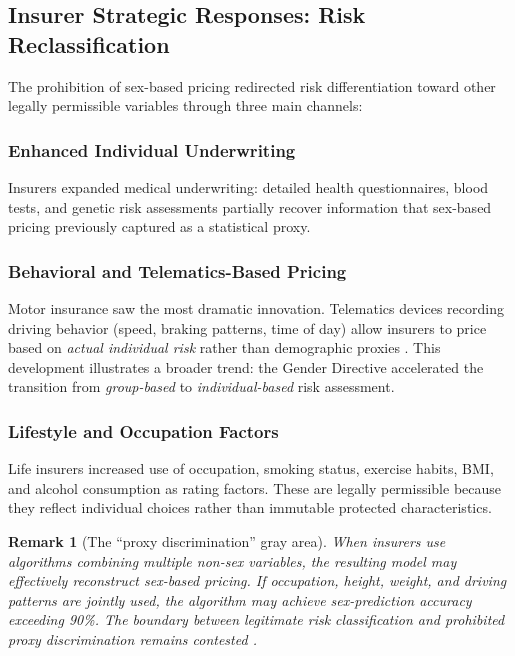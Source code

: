 \documentclass[12pt,a4paper]{article}
\newtheorem{remark}[definition]{Remark}
\begin{document}
\subsection{Insurer Strategic Responses: Risk Reclassification}
\label{subsec:insurer-responses}

The prohibition of sex-based pricing redirected risk differentiation toward other legally permissible variables through three main channels:

\subsubsection{Enhanced Individual Underwriting}

Insurers expanded medical underwriting: detailed health questionnaires, blood tests, and genetic risk assessments partially recover information that sex-based pricing previously captured as a statistical proxy.

\subsubsection{Behavioral and Telematics-Based Pricing}

Motor insurance saw the most dramatic innovation. Telematics devices recording driving behavior (speed, braking patterns, time of day) allow insurers to price based on \emph{actual individual risk} rather than demographic proxies \cite{cather2020}. This development illustrates a broader trend: the Gender Directive accelerated the transition from \emph{group-based} to \emph{individual-based} risk assessment.

\subsubsection{Lifestyle and Occupation Factors}

Life insurers increased use of occupation, smoking status, exercise habits, BMI, and alcohol consumption as rating factors. These are legally permissible because they reflect individual choices rather than immutable protected characteristics.

\begin{remark}[The ``proxy discrimination'' gray area]
When insurers use algorithms combining multiple non-sex variables, the resulting model may effectively reconstruct sex-based pricing. If occupation, height, weight, and driving patterns are jointly used, the algorithm may achieve sex-prediction accuracy exceeding 90\%. The boundary between legitimate risk classification and prohibited proxy discrimination remains contested \cite{ec_guidelines2012, chen2023}.
\end{remark}
\end{document}
